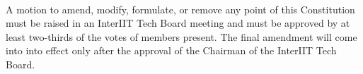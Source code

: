 
\paragraph{}
A motion to amend, modify, formulate, or remove any point of this Constitution must be raised in an InterIIT Tech Board meeting and must be approved by at least two-thirds of the votes of members present. The final amendment will come into into effect only after the approval of the Chairman of the InterIIT Tech Board.
